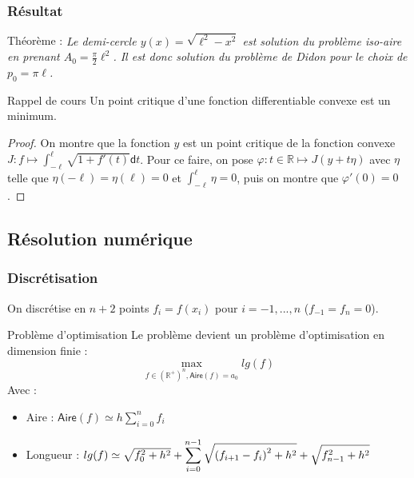 \documentclass[11pt,envcountsect,aspectratio=169]{beamer} %
\newcommand{\R}{\mathbb{R}}
\renewcommand{\d}{\mathsf{d}}
\renewcommand{\phi}{\varphi}
\newcommand{\A}{\mathsf{Aire}}
\newcommand\thm[2]{%
    \begin{beamerboxesrounded}[upper=titreB,lower=texteB,shadow=true]{Théorème : #1}
        \it #2
    \end{beamerboxesrounded}
    \normalfont
}
\begin{document}
\begin{frame}
    \frametitle{Résultat}

    \thm{}{%
        Le demi-cercle $y(x)=\sqrt{\ell^2-x^2}$ est solution du problème iso-aire en prenant $A_0=\frac{\pi}{2}\ell^2$. Il est donc solution du problème de Didon pour le choix de $p_0=\pi\ell$.
    }

    \begin{beamerboxesrounded}[upper=titreV,lower=texteV,shadow=true]{Rappel de cours}
        Un point critique d'une fonction differentiable convexe est un minimum.
    \end{beamerboxesrounded}



    \begin{proof}
    On montre que la fonction $y$ est un point critique de la fonction convexe $J\colon f\mapsto \int_{-\ell}^\ell \sqrt{1+f'(t)}\d t$.
    Pour ce faire, on pose $\phi\colon t\in\R\mapsto J(y+t\eta)$ avec $\eta$ telle que $\eta(-\ell)=\eta(\ell)=0$ et $\int_{-\ell}^\ell \eta=0$, puis on montre que $\phi'(0)=0$.
    \end{proof}

\end{frame}





\subsection{Résolution numérique}

\begin{frame}
    \frametitle{Discrétisation}

    On discrétise en $n+2$ points $f_i = f(x_i)$ pour $i=-1,...,n$ ($f_{-1}=f_n=0$).

    \begin{beamerboxesrounded}[upper=titreB,lower=texteB,shadow=true]{Problème d'optimisation}
        Le problème devient un problème d'optimisation en dimension finie :
        \[\max_{f \in \left(\R^+\right)^n, \A(f)=a_0} lg(f)\]
        Avec :
        \begin{itemize}
            \item Aire : $\A(f) \simeq h \sum_{i=0}^n{f_i}$
            \item Longueur : $lg(f) \simeq  \sqrt{f_0^2+h^2} + \displaystyle\sum_{i=0}^{n-1}{\sqrt{\vphantom{f_n^2}{(f_{i+1}-f_i)}^2+h^2}} + \sqrt{f_{n-1}^2+h^2} $
        \end{itemize}
    \end{beamerboxesrounded}

\end{frame}
\end{document}

